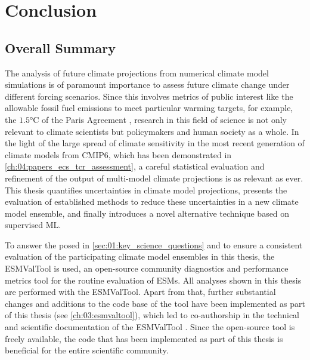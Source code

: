 
%



\chapter{Conclusion}
\label{ch:07:conclusion}


\section{Overall Summary}
\label{sec:07:overall_summary}

The analysis of future climate projections from numerical climate model
simulations is of paramount importance to assess future climate change under
different forcing scenarios. Since this involves metrics of public interest
like the allowable fossil fuel emissions to meet particular warming targets,
for example, the $1.5 \unit{\degreeCelsius}$ of the Paris Agreement
\autocite{UNFCCC2015}, research in this field of science is not only relevant
to climate scientists but policymakers and human society as a whole. In the
light of the large spread of climate sensitivity in the most recent generation
of climate models from \acs{CMIP}6, which has been demonstrated in
\cref{ch:04:papers_ecs_tcr_assessment}, a careful statistical evaluation and
refinement of the output of multi-model climate projections is as relevant as
ever. This thesis quantifies uncertainties in climate model projections,
presents the evaluation of established methods to reduce these uncertainties in
a new climate model ensemble, and finally introduces a novel alternative
technique based on supervised \ac{ML}.

To answer the  posed in
\cref{sec:01:key_science_questions} and to ensure a consistent evaluation of
the participating climate model ensembles in this thesis, the \ac{ESMValTool}
is used, an open-source community diagnostics and performance metrics tool for
the routine evaluation of \acp{ESM}. All analyses shown in this thesis are
performed with the \ac{ESMValTool}. Apart from that, further substantial
changes and additions to the code base of the tool have been implemented as
part of this thesis (see \cref{ch:03:esmvaltool}), which led to co-authorship
in the technical and scientific documentation of the \ac{ESMValTool}
\autocite{Eyring2020, Lauer2020, Righi2020, Weigel2020}. Since the open-source
tool is freely available, the code that has been implemented as part of this
thesis is beneficial for the entire scientific community.

